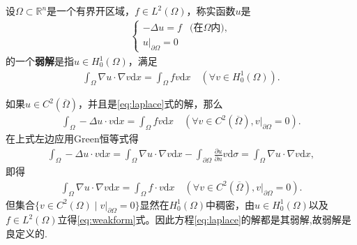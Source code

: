 \documentclass[../../main.tex]{subfiles}%
\begin{document}
\begin{definition}
设$\Omega\subset\mathbb{R}^n$是一个有界开区域，$f\in L^2(\Omega)$，称实函数$u$是
\begin{align}
\begin{cases}
-\Delta u=f & \text{(在$\Omega$内)}, \\
u|_{\partial\Omega}=0
\end{cases}
\label{eq:laplace}
\end{align}
的一个\textbf{弱解}是指$u\in H_0^1(\Omega)$，满足
\begin{align}
\int_\Omega \nabla u\cdot\nabla v\mathrm{d}x=\int_\Omega fv\mathrm{d}x\quad (\forall v\in H_0^1(\Omega)).
\label{eq:weakform}
\end{align}
\end{definition}
\begin{remark}
如果$u\in C^2(\overline{\Omega})$，并且是\eqref{eq:laplace}式的解，那么
\begin{align*}
\int_\Omega -\Delta u\cdot v\mathrm{d}x=\int_\Omega fv\mathrm{d}x\quad (\forall v\in C^2(\overline{\Omega}),v|_{\partial\Omega}=0).
\end{align*}
在上式左边应用Green恒等式得
\begin{align*}
\int_\Omega -\Delta u\cdot v\mathrm{d}x=\int_\Omega \nabla u\cdot\nabla v\mathrm{d}x-\int_{\partial\Omega}\frac{\partial u}{\partial n}v\mathrm{d}\sigma
=\int_\Omega \nabla u\cdot\nabla v\mathrm{d}x,
\end{align*}
即得
\begin{align*}
\int_\Omega \nabla u\cdot\nabla v\mathrm{d}x=\int_\Omega f\cdot v\mathrm{d}x\quad (\forall v\in C^2(\overline{\Omega}),v|_{\partial\Omega}=0).
\end{align*}
但集合$\{v\in C^2(\Omega)\mid v|_{\partial\Omega}=0\}$显然在$H_0^1(\Omega)$中稠密，由$u\in H_0^1(\Omega)$以及$f\in L^2(\Omega)$立得\eqref{eq:weakform}式。因此方程\eqref{eq:laplace}的解都是其弱解,故弱解是良定义的.
\end{remark}
\end{document}
